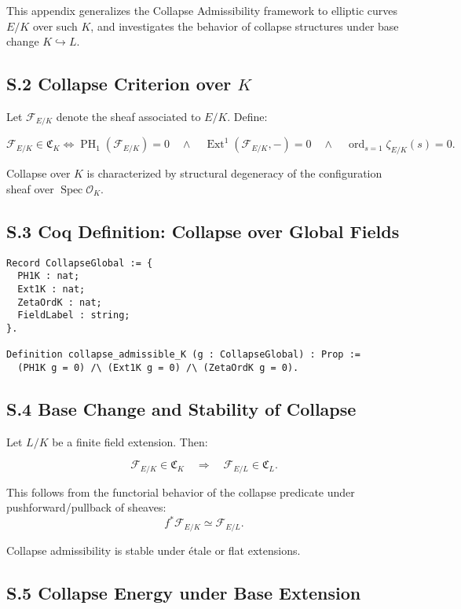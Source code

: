 \documentclass[11pt]{article}
\DeclareMathOperator{\Ext}{Ext}
\DeclareMathOperator{\Spec}{Spec}
\DeclareMathOperator{\PH}{PH}
\newcommand{\ord}{\operatorname{ord}}
\begin{document}
This appendix generalizes the Collapse Admissibility framework to elliptic curves \( E/K \) over such \( K \), and investigates the behavior of collapse structures under base change \( K \hookrightarrow L \).

\subsection*{S.2 Collapse Criterion over \( K \)}

Let \( \mathcal{F}_{E/K} \) denote the sheaf associated to \( E/K \). Define:

\[
\mathcal{F}_{E/K} \in \mathfrak{C}_K \iff 
\PH_1(\mathcal{F}_{E/K}) = 0 \quad \land \quad 
\Ext^1(\mathcal{F}_{E/K}, -) = 0 \quad \land \quad 
\ord_{s=1} \zeta_{E/K}(s) = 0.
\]

Collapse over \( K \) is characterized by structural degeneracy of the configuration sheaf over \( \Spec \mathcal{O}_K \).

\subsection*{S.3 Coq Definition: Collapse over Global Fields}
\begin{lstlisting}[language=Coq]
Record CollapseGlobal := {
  PH1K : nat;
  Ext1K : nat;
  ZetaOrdK : nat;
  FieldLabel : string;
}.

Definition collapse_admissible_K (g : CollapseGlobal) : Prop :=
  (PH1K g = 0) /\ (Ext1K g = 0) /\ (ZetaOrdK g = 0).
\end{lstlisting}

\subsection*{S.4 Base Change and Stability of Collapse}

Let \( L/K \) be a finite field extension. Then:

\[
\mathcal{F}_{E/K} \in \mathfrak{C}_K
\quad \Longrightarrow \quad 
\mathcal{F}_{E/L} \in \mathfrak{C}_L.
\]

This follows from the functorial behavior of the collapse predicate under pushforward/pullback of sheaves:
\[
f^* \mathcal{F}_{E/K} \simeq \mathcal{F}_{E/L}.
\]

Collapse admissibility is stable under étale or flat extensions.

\subsection*{S.5 Collapse Energy under Base Extension}
\end{document}
